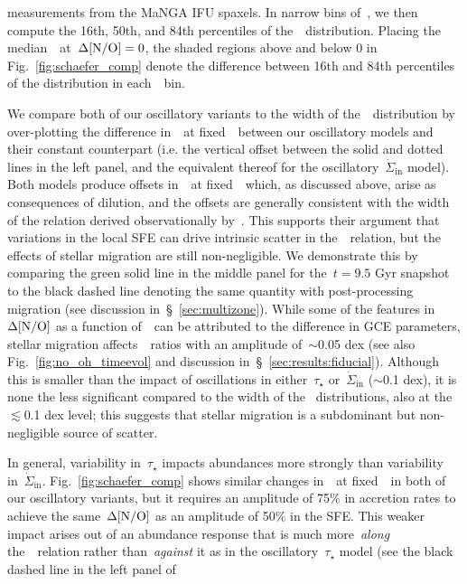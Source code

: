 \documentclass[ms.tex]{subfiles}
\begin{document}
measurements from the MaNGA IFU spaxels.
In narrow bins of~\oh, we then compute the 16th, 50th, and 84th percentiles of
the~\no~distribution.
Placing the median~\no~at~$\Delta\text{[N/O]} = 0$, the shaded regions above and below
0 in Fig.~\ref{fig:schaefer_comp} denote the difference between 16th and 84th
percentiles of the distribution in each~\oh~bin.
\par
We compare both of our oscillatory variants to the width of the~\no~distribution
by over-plotting the difference in~\no~at fixed~\oh~between our oscillatory
models and their constant counterpart (i.e. the vertical offset between the
solid and dotted lines in the left panel, and the equivalent thereof for the
oscillatory~$\dot{\Sigma}_\text{in}$ model).
Both models produce offsets in~\no~at fixed~\oh~which, as discussed above,
arise as consequences of dilution, and the offsets are generally consistent
with the width of the relation derived observationally by~\citet{Schaefer2020}.
This supports their argument that variations in the local SFE can drive
intrinsic scatter in the~\ohno~relation, but the effects of stellar migration
are still non-negligible.
We demonstrate this by comparing the green solid line in the middle panel for
the~$t = 9.5$ Gyr snapshot to the black dashed line denoting the same quantity
with post-processing migration (see discussion in~\S~\ref{sec:multizone}).
While some of the features in~$\Delta\text{[N/O]}$ as a function of~\oh~can be
attributed to the difference in GCE parameters, stellar migration
affects~\no~ratios with an amplitude of~$\sim$0.05 dex (see also
Fig.~\ref{fig:no_oh_timeevol} and discussion in~\S~\ref{sec:results:fiducial}).
Although this is smaller than the impact of oscillations in either~$\tau_\star$
or~$\dot{\Sigma}_\text{in}$ ($\sim$0.1 dex), it is none the less significant
compared to the width of the~\citet{Schaefer2020} distributions, also at
the~$\lesssim$0.1 dex level; this suggests that stellar migration is a
subdominant but non-negligible source of scatter.
\par
In general, variability in~$\tau_\star$ impacts abundances more strongly than
variability in~$\dot{\Sigma}_\text{in}$.
Fig.~\ref{fig:schaefer_comp} shows similar changes in~\no~at fixed~\oh~in both
of our oscillatory variants, but it requires an amplitude of 75\% in accretion
rates to achieve the same~$\Delta\text{[N/O]}$ as an amplitude of 50\% in the SFE.
This weaker impact arises out of an abundance response that is much
more~\textit{along} the~\ohno~relation rather than~\textit{against} it as in the
oscillatory~$\tau_\star$ model (see the black dashed line in the left panel of
\end{document}
